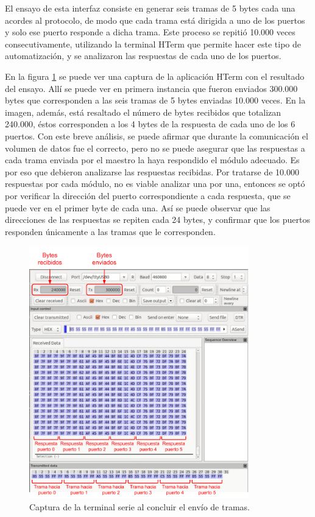 El ensayo de esta interfaz consiste en generar seis tramas de 5 bytes cada una acordes al protocolo, de modo que cada trama está dirigida a uno de los puertos y solo ese puerto responde a dicha trama. Este proceso se repitió 10.000 veces consecutivamente, utilizando la terminal HTerm que permite hacer este tipo de automatización, y se analizaron las respuestas de cada uno de los puertos. 

En la figura \ref{fig:AtaqueBytes} se puede ver una captura de la aplicación HTerm con el resultado del ensayo. Allí se puede ver en primera instancia que fueron enviados 300.000 bytes que corresponden a las seis tramas de 5 bytes enviadas 10.000 veces. En la imagen, además, está resaltado el número de bytes recibidos que totalizan 240.000, éstos corresponden a los 4 bytes de la respuesta de cada uno de los 6 puertos.
Con este breve análisis, se puede afirmar que durante la comunicación el volumen de datos fue el correcto, pero no se puede asegurar que las respuestas a cada trama enviada por el maestro la haya respondido el módulo adecuado.
Es por eso que debieron analizarse las respuestas recibidas. Por tratarse de 10.000 respuestas por cada módulo, no es viable analizar una por una, entonces se optó por verificar la dirección del puerto correspondiente a cada respuesta, que se puede ver en el primer byte de cada una. Así se puede observar que las direcciones de las respuestas se repiten cada 24 bytes, y confirmar que los puertos responden únicamente a las tramas que le corresponden.

\begin{figure}[H]
	\centering
	\includegraphics[width=0.85\textwidth]{./Figures/AtaqueBytes.pdf}
	\caption{Captura de la terminal serie al concluir el envío de tramas.}
	\label{fig:AtaqueBytes}
\end{figure}

